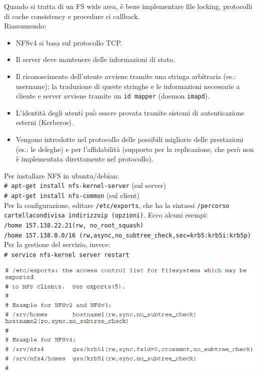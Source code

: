 \documentclass[a4paper]{report}
\newcommand\tab[1][1cm]{\hspace*{#1}}
\begin{document}
Quando si tratta di un FS wide area, è bene implementare file locking, protocolli di cache consistency e procedure ci callback.\\
Riassumendo:
\begin{itemize}
\item NFSv4 si basa sul protocollo TCP.
\item Il server deve mantenere delle informazioni di stato.
\item Il riconoscimento dell'utente avviene tramite una stringa arbitraria (es.: username); la traduzione di queste stringhe e le informazioni necessarie a cliente e server avviene tramite un \texttt{id mapper} (daemon \texttt{imapd}).
\item L'identità degli utenti può essere provata tramite sistemi di autenticazione esterni (Kerberos).
\item Vengono introdotte nel protocollo delle possibili migliorie delle prestazioni (es.: le deleghe) e per l'affidabilità (supporto per la replicazione, che però non è implementata direttamente nel protocollo).
\end{itemize}
Per installare NFS in ubuntu/debian:\\
\tab\texttt{\# apt-get install nfs-kernel-server} (sul server)\\
\tab\texttt{\# apt-get install nfs-common} (sul client)\\
Per la configurazione, editare \texttt{/etc/exports}, che ha la sintassi \texttt{/percorso cartellacondivisa indirizzoip (opzioni)}. Ecco alcuni esempi:\\
\tab\texttt{/home 157.138.22.21(rw, no\_root\_squash)}\\
\tab\texttt{/home 157.138.0.0/16
(rw,async,no\_subtree\_check,sec=krb5:krb5i:krb5p)}\\
Per la gestione del servizio, invece:\\
\tab\texttt{\# service nfs-kernel server restart}\\
\begin{center}
\includegraphics[scale=0.60]{fsesempioconf.png}
\end{center}
\end{document}
